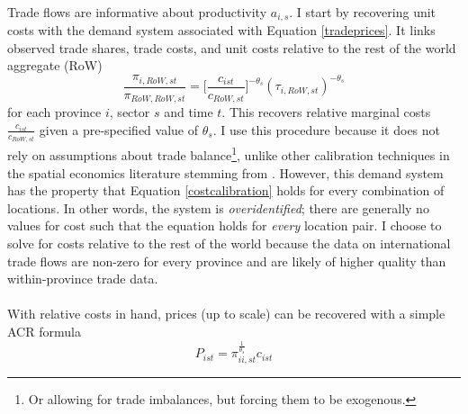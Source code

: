 \documentclass[]{article}
\theoremstyle{plain}
\begin{document}
\paragraph*{}
Trade flows are informative about productivity $\hat{a_{i,s}}$. I start by recovering unit costs with the demand system associated with Equation \eqref{tradeprices}. It links observed trade shares, trade costs, and unit costs relative to the rest of the world aggregate (RoW)
\begin{equation}\label{costcalibration}
	\frac{\pi_{i, RoW, st}}{\pi_{RoW, RoW, st}} = \bigg[\frac{c_{ist}}{c_{RoW, st}}\bigg]^{-\theta_{s}}(\tau_{i, RoW, st})^{-\theta_{s}}
\end{equation}
for each province $i$, sector $s$ and time $t$. This recovers relative marginal costs $\frac{c_{ist}}{c_{RoW,st}}$ given a pre-specified value of $\theta_{s}$. I use this procedure because it does not rely on assumptions about trade balance\footnote{Or allowing for trade imbalances, but forcing them to be exogenous.}, unlike other calibration techniques in the spatial economics literature stemming from \citet{redding2016}. However, this demand system has the property that Equation \eqref{costcalibration} holds for every combination of locations. In other words, the system is \textit{overidentified}; there are generally no values for cost such that the equation holds for \textit{every} location pair. I choose to solve for costs relative to the rest of the world because the data on international trade flows are non-zero for every province and are likely of higher quality than within-province trade data.
\paragraph*{}
With relative costs in hand, prices (up to scale) can be recovered with a simple ACR formula \citep{ACR}  
\begin{equation}\label{calibratedprices}
	P_{ist} = \pi_{ii, st}^{\frac{1}{\theta_{s}}}c_{ist}
\end{equation}
 
\end{document}
